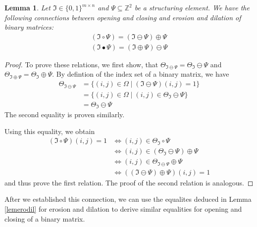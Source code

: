 \documentclass[a4paper,12pt]{article}
\theoremstyle{plain}
\newtheorem{lemma}[theorem]{Lemma}
\theoremstyle{definition}
\begin{document}
\begin{lemma}
	Let $\mathfrak{I} \in \{ 0, 1 \}^{m \times n}$ and $\Psi \subseteq \mathbb{Z}^2$ be a structuring element. We have the following connections between opening and closing and erosion and dilation of binary matrices:
	\begin{align}
		(\mathfrak{I} \circ \Psi) = (\mathfrak{I} \ominus \Psi) \oplus \Psi \\
		(\mathfrak{I} \bullet \Psi) = (\mathfrak{I} \oplus \Psi) \ominus \Psi
	\end{align}
\end{lemma}
\begin{proof}
	To prove these relations, we first show, that $\Theta_{\mathfrak{I} \ominus \Psi} = \Theta_\mathfrak{I} \ominus \Psi$ and $\Theta_{\mathfrak{I} \oplus \Psi} = \Theta_\mathfrak{I} \oplus \Psi$. By defintion of the index set of a binary matrix, we have
	\begin{align*}
		\Theta_{\mathfrak{I} \ominus \Psi} &= \{ (i, j) \in \Omega \mid (\mathfrak{I} \ominus \Psi)(i, j) = 1 \} \\
		&= \{ (i, j) \in \Omega \mid (i, j) \in \Theta_\mathfrak{I} \ominus \Psi \} \\
		&= \Theta_\mathfrak{I} \ominus \Psi
	\end{align*}
	The second equality is proven similarly.
	
	Using this equality, we obtain
	\begin{align*}
		(\mathfrak{I} \circ \Psi)(i, j) = 1 &\Leftrightarrow (i, j) \in \Theta_\mathfrak{I} \circ \Psi \\
		&\Leftrightarrow (i, j) \in (\Theta_\mathfrak{I} \ominus \Psi) \oplus \Psi \\
		&\Leftrightarrow (i, j) \in \Theta_{\mathfrak{I} \ominus \Psi} \oplus \Psi \\
		&\Leftrightarrow ((\mathfrak{I} \ominus \Psi) \oplus \Psi)(i, j) = 1
	\end{align*}
	and thus prove the first relation. The proof of the second relation is analogous.
\end{proof}

After we established this connection, we can use the equalites deduced in Lemma \ref{lemerodil} for erosion and dilation to derive similar equalities for opening and closing of a binary matrix.
\end{document}
